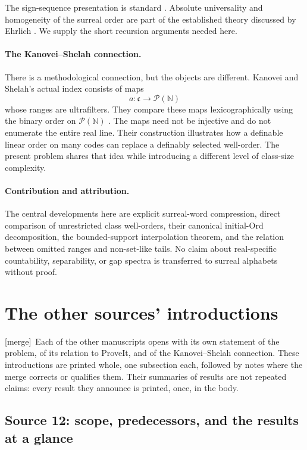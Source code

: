 \documentclass[11pt]{article}
\theoremstyle{definition}
\theoremstyle{remark}
\newcommand{\Ord}{\mathrm{Ord}}
\newcommand{\merge}{\textsf{[merge]}}
\begin{document}
The sign-sequence presentation is standard \cite{Gonshor,BagayokoHoeven}.
Absolute universality and homogeneity of the surreal order are part of
the established theory discussed by Ehrlich \cite{Ehrlich2012}.
We supply the short recursion arguments needed here.

\paragraph{The Kanovei--Shelah connection.}
There is a methodological connection, but the objects are different.
Kanovei and Shelah's actual index consists of maps
\[
 a:\mathfrak c\longrightarrow\mathcal P(\mathbb N)
\]
whose ranges are ultrafilters. They compare these maps lexicographically
using the binary order on \(\mathcal P(\mathbb N)\)
\cite[Section 1]{KanoveiShelah}. The maps need not be injective and do
not enumerate the entire real line. Their construction illustrates how
a definable linear order on many codes can replace a definably selected
well-order. The present problem shares that idea while introducing a
different level of class-size complexity.

\paragraph{Contribution and attribution.}
The central developments here are explicit surreal-word compression,
direct comparison of unrestricted class well-orders, their canonical
initial-\(\Ord\) decomposition, the bounded-support interpolation
theorem, and the relation between omitted ranges and non-set-like tails.
No claim about real-specific countability, separability, or gap spectra
is transferred to surreal alphabets without proof.


\section{The other sources' introductions}\label{swo:sec:intros}

\merge\ Each of the other manuscripts opens with its own statement of the
problem, of its relation to ProveIt, and of the Kanovei--Shelah connection.
These introductions are printed whole, one subsection each, followed by
notes where the merge corrects or qualifies them. Their summaries of results
are not repeated claims: every result they announce is printed, once, in the
body.

\subsection{Source 12: scope, predecessors, and the results at a glance}
\label{swo:st:sec:scope}
\end{document}
